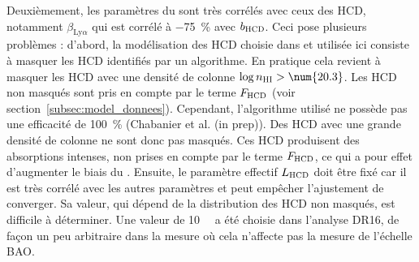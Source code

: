 Deuxièmement, les paramètres du \lya{} sont très corrélés avec ceux des HCD, notamment $\beta_{\mathrm{Ly}\alpha}$ qui est corrélé à \SI{-75}{\percent} avec $b_{\textsc{HCD}}$.
Ceci pose plusieurs problèmes : d'abord, la modélisation des HCD choisie dans \textcite{DuMasdesBourboux2020} et utilisée ici consiste à masquer les HCD identifiés par un algorithme. En pratique cela revient à masquer les HCD avec une densité de colonne $\log n_{\textsc{HI}} > \num{20.3}$. Les HCD non masqués sont pris en compte par le terme $F_{\textsc{HCD}}$ (voir section~\ref{subsec:model_donnees}).
Cependant, l'algorithme utilisé ne possède pas une efficacité de \SI{100}{\percent} (Chabanier et al. (in prep)). Des HCD avec une grande densité de colonne ne sont donc pas masqués.
Ces HCD produisent des absorptions intenses, non prises en compte par le terme $F_{\textsc{HCD}}$, ce qui a pour effet d'augmenter le biais du \lya{}.
Ensuite, le paramètre effectif $L_{\textsc{HCD}}$ doit être fixé car il est très corrélé avec les autres paramètres et peut empêcher l'ajustement de converger.
Sa valeur, qui dépend de la distribution des HCD non masqués, est difficile à déterminer.
Une valeur de \SI{10}{\perh\Mpc} a été choisie dans l’analyse DR16, de façon un peu arbitraire dans la mesure où cela n’affecte pas la mesure de l’échelle BAO.

